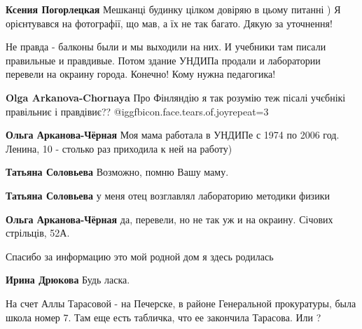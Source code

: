 \begin{itemize}
\begin{itemize}
\begin{itemize}
\textbf{Ксения Погорлецкая} Мешканці будинку цілком довіряю в цьому питанні ) Я орієнтувався на фотографії, що мав, а їх не так багато. Дякую за уточнення!
\end{itemize} %

\end{itemize} %


Не правда - балконы были и мы выходили на них. И учебники там писали правильные
и правдивые. Потом здание УНДИПа продали и лаборатории перевели на окраину
города. Конечно! Кому нужна педагогика!

\begin{itemize} %
\textbf{Olga Arkanova-Chornaya} Про Фінляндію я так розумію теж пісалі учєбнікі правільниє і правдівиє??  @igg{fbicon.face.tears.of.joy}{repeat=3} 

\textbf{Ольга Арканова-Чёрная} Моя мама работала в УНДИПе с 1974 по 2006 год. Ленина, 10 - столько раз приходила к ней на работу)

\textbf{Татьяна Соловьева} Возможно, помню Вашу маму.

\textbf{Татьяна Соловьева} у меня отец возглавлял лабораторию методики физики

\textbf{Ольга Арканова-Чёрная} да, перевели, но не так уж и на окраину. Січових стрільців, 52А.
\end{itemize} %

Спасибо за информацию это мой родной дом я здесь родилась

\textbf{Ирина Дрюкова} Будь ласка.


На счет Аллы Тарасовой - на Печерске, в районе Генеральной прокуратуры, была
школа номер 7. Там еще есть табличка, что ее закончила Тарасова. Или ?

\end{itemize} %

